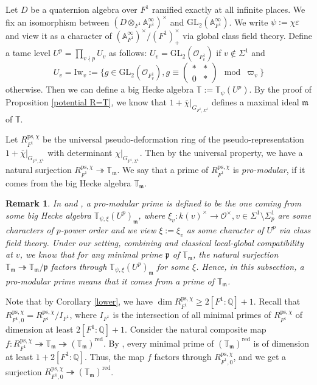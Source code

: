\documentclass[a4paper, 12pt]{amsart}
\newtheorem{rem}[thm]{\bf Remark}
\def\ps{\mathrm{ps}}
\newcommand{\Q}{\mathbb{Q}}
\newcommand{\T}{\mathbb{T}}
\newcommand{\A}{\mathbb{A}}
\newcommand{\GL}{\mathrm{GL}}
\newcommand{\cO}{\mathcal{O}}
\newcommand{\kp}{\mathfrak{p}}
\newcommand{\km}{\mathfrak{m}}
\begin{document}
    Let $D$ be a quaternion algebra over $F^1$ ramified exactly at all infinite places. We fix an isomorphism between $(D \otimes_{F^1}\A_{F^1}^\infty )^\times$ and $\GL_2(\A_{F^1}^\infty)$. We write $\psi:=\chi\varepsilon$ and view it as a character of $(\A_{F^1}^\infty )^\times/(F^1)^\times_{+}$ via global class field theory. Define a tame level $U^p=\prod_{v\nmid p}U_v$ as follows: $U_v=\GL_2(\cO_{F^1_v})$ if $v\notin \Sigma^1$ and 
    \[U_v=\mathrm{Iw}_v:=\{g\in\GL_2(\cO_{F^1_v}),g\equiv \begin{pmatrix}*&*\\0&*\end{pmatrix}\mod \varpi_v\}\]
    otherwise. Then we can define a big Hecke algebra $\T:=\T_\psi(U^p)$. By the proof of Proposition \ref{potential R=T}, we know that $1+\bar{\chi}|_{G_{F^1, \Sigma^1}}$ defines a maximal ideal $\km$ of $\T $.
    
    Let $R_{F^1}^{\ps, \chi}$ be the universal pseudo-deformation ring of the pseudo-representation $1+\bar{\chi}|_{G_{F^1, \Sigma^1}}$ with determinant $\chi|_{G_{F^1, \Sigma^1}}$. Then by the universal property, we have a natural surjection $R_{F^1}^{\ps, \chi} \twoheadrightarrow \T_\km$. We say that a prime of $R_{F^1}^{\ps, \chi}$ is \textit{pro-modular}, if it comes from the big Hecke algebra $\T_\km$.
    
     \begin{rem}
    	In \cite{pan2022fontaine} and \cite{Zhang:2024aa}, a pro-modular prime is defined to be the one coming from some big Hecke algebra $\T_{\psi, \xi}(U^p)_\km$, where $\xi_v: k(v)^\times \to \cO^\times, v\in \Sigma^1\setminus\Sigma_p^1$ are some characters of $p$-power order and we view $\xi:={\xi_v}$ as some character of $U^p$ via class field theory. Under our setting, combining \cite[Proposition 3.1.5]{Zhang:2024ab} and classical local-global compatibility at $v$, we know that for any minimal prime $\kp$ of $\T_\km$, the natural surjection $\T_\km \twoheadrightarrow \T_\km/\kp  $ factors through $\T_{\psi, \xi}(U^p)_\km$ for some $\xi$. Hence, in this subsection, a pro-modular prime means that it comes from a prime of $\T_\km$.
    \end{rem}
    
    Note that by Corollary \ref{lower}, we have $\dim R_{F^1}^{\ps, \chi} \ge 2[F^1:\Q]+1 $. Recall that $R_{F^1,0}^{\ps, \chi}= R_{F^1}^{\ps, \chi}/I_{F^1}$, where $ I_{F^1}$ is the intersection of all minimal primes of $R_{F^1}^{\ps, \chi} $ of dimension at least $2[F^1:\Q]+1 $. Consider the natural composite map $f: R_{F^1}^{\ps, \chi} \twoheadrightarrow \T_\km \twoheadrightarrow (\T_\km)^{\operatorname{red}}$. By \cite[Corollary 3.3.10]{Zhang:2024aa}, every minimal prime of $(\T_\km)^{\operatorname{red}}$ is of dimension at least $1+2[F^1:\Q]$. Thus, the map $f$ factors through $R_{F^1,0}^{\ps, \chi}$, and we get a surjection $R_{F^1,0}^{\ps, \chi} \twoheadrightarrow (\T_\km)^{\operatorname{red}}$.
    
\end{document}
